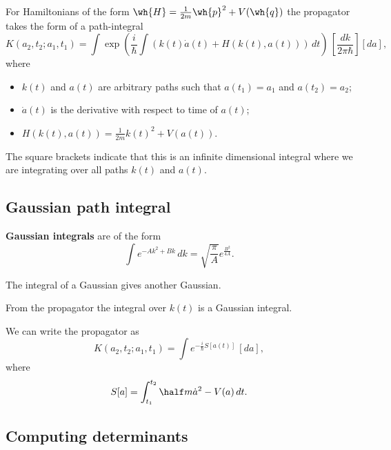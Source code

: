 \documentclass[12pt, a4paper]{article}
\begin{document}
\begin{mdthm}
    For Hamiltonians of the form \(\wh{H} = \frac{1}{2m} \wh{p}^2 +V(\wh{q})\) the propagator takes the form of a path-integral
    \[K(a_2,t_2;a_1,t_1) = \int \exp\left( \frac{i}{\hbar}\int\left( k(t)\dot{a}(t)+H(k(t),a(t)) \right) \, dt\right) \, \left[ \frac{dk}{2\pi\hbar} \right] \left[ da \right],\]
    where 
    \begin{itemize}
        \item \(k(t)\) and \(a(t)\) are arbitrary paths such that \(a(t_1) =a_1\) and \(a(t_2)=a_2\);
        \item \(\dot{a}(t)\) is the derivative with respect to time of \(a(t)\);
        \item \(H(k(t),a(t)) = \frac{1}{2m}k(t)^2+V(a(t))\).
    \end{itemize}
    The square brackets indicate that this is an infinite dimensional integral where we are integrating over all paths \(k(t)\) and \(a(t)\).
\end{mdthm}

\subsection{Gaussian path integral}

\begin{definition}
    \textbf{Gaussian integrals} are of the form
    \[\int e^{-Ak^2+Bk} \, dk = \sqrt{\frac{\pi}{A}} e^\frac{B^2}{4A}.\]
\end{definition}

\begin{theorem}
    The integral of a Gaussian gives another Gaussian.
\end{theorem}

\begin{theorem}
    From the propagator the integral over \(k(t)\) is a Gaussian integral.
\end{theorem}

\begin{proposition}
    We can write the propagator as 
    \[K(a_2,t_2;a_1,t_1) = \int e^{-\frac{i}{\hbar}S[a(t)]} \, [da],\]
    where 
    \[S[a] = \int_{t_1}^{t_2} \half m\dot{a}^2-V(a)\, dt.\]
\end{proposition}

\subsection{Computing determinants}
\end{document}
